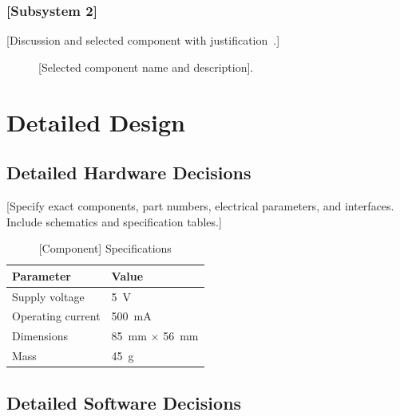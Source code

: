 \documentclass[12pt, a4paper]{report}
\begin{document}
\subsection{[Subsystem 2]}

[Discussion and selected component with justification~\cite{ref3}.]

\begin{figure}[H]
    \centering
    \caption{[Selected component name and description].}
    \label{fig:component}
\end{figure}

\chapter{Detailed Design}
\label{ch:detailed}

\section{Detailed Hardware Decisions}
\label{sec:detailed-hw}

[Specify exact components, part numbers, electrical parameters, and
interfaces. Include schematics and specification tables.]

\begin{table}[H]
    \centering
    \caption{[Component] Specifications}
    \label{tab:component-specs}
    \begin{tabular}{@{} l l @{}}
        \toprule
        \textbf{Parameter} & \textbf{Value} \\
        \midrule
        Supply voltage      & \SI{5}{\volt} \\
        Operating current   & \SI{500}{\milli\ampere} \\
        Dimensions          & \SI{85}{\milli\metre} $\times$ \SI{56}{\milli\metre} \\
        Mass                & \SI{45}{\gram} \\
        \bottomrule
    \end{tabular}
\end{table}

\section{Detailed Software Decisions}
\label{sec:detailed-sw}
\end{document}
